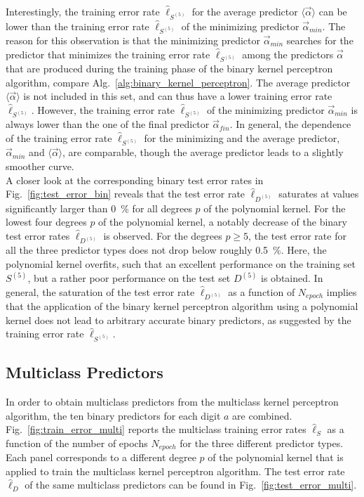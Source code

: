 Interestingly, the training error rate $\hat{\ell}_{S^{(5)}}$ for the average predictor $\langle\vec{\alpha}\rangle$ can be lower than the training error rate $\hat{\ell}_{S^{(5)}}$ of the minimizing predictor $\vec{\alpha}_{min}$. The reason for this observation is that the minimizing predictor $\vec{\alpha}_{min}$ searches for the predictor that minimizes the training error rate $\hat{\ell}_{S^{(5)}}$ among the predictors $\vec{\alpha}$ that are produced during the training phase of the binary kernel perceptron algorithm, compare Alg.~\ref{alg:binary_kernel_perceptron}. The average predictor $\langle\vec{\alpha}\rangle$ is not included in this set, and can thus have a lower training error rate $\hat{\ell}_{S^{(5)}}$. However, the training error rate $\hat{\ell}_{S^{(5)}}$ of the minimizing predictor $\vec{\alpha}_{min}$ is always lower than the one of the final predictor $\vec{\alpha}_{fin}$. In general, the dependence of the training error rate $\hat{\ell}_{S^{(5)}}$ for the minimizing and the average predictor, $\vec{\alpha}_{min}$ and $\langle\vec{\alpha}\rangle$, are comparable, though the average predictor leads to a slightly smoother curve.\\

A closer look at the corresponding binary test error rates in Fig.~\ref{fig:test_error_bin} reveals that the test error rate $\hat{\ell}_{D^{(5)}}$ saturates at values significantly larger than \SI{0}{\percent} for all degrees $p$ of the polynomial kernel. For the lowest four degrees $p$ of the polynomial kernel, a notably decrease of the binary test error rates $\hat{\ell}_{D^{(5)}}$ is observed. For the degrees $p\geq 5$, the test error rate for all the three predictor types does not drop below roughly \SI{0.5}{\percent}. Here, the polynomial kernel overfits, such that an excellent performance on the training set $S^{(5)}$, but a rather poor performance on the test set $D^{(5)}$ is obtained. In general, the saturation of the test error rate $\hat{\ell}_{D^{(5)}}$ as a function of $N_{epoch}$ implies that the application of the binary kernel perceptron algorithm using a polynomial kernel does not lead to arbitrary accurate binary predictors, as suggested by the training error rate $\hat{\ell}_{S^{(5)}}$.

\subsection{Multiclass Predictors}\label{subsec:multi_pred}
In order to obtain multiclass predictors from the multiclass kernel perceptron algorithm, the ten binary predictors for each digit $a$ are combined. Fig.~\ref{fig:train_error_multi} reports the multiclass training error rates $\hat{\ell}_S$ as a function of the number of epochs $N_{epoch}$ for the three different predictor types. Each panel corresponds to a different degree $p$ of the polynomial kernel that is applied to train the multiclass kernel perceptron algorithm. The test error rate $\hat{\ell}_D$ of the same multiclass predictors can be found in Fig.~\ref{fig:test_error_multi}.\\

